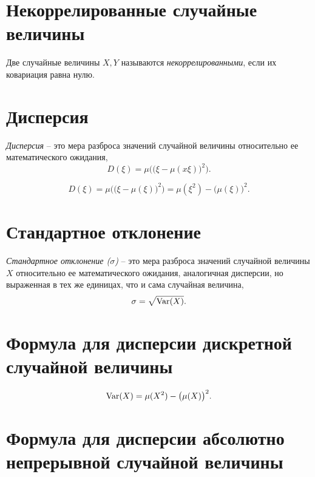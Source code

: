 \section{Некоррелированные случайные величины}

\begin{definition}
	Две случайные величины $X,Y$ называются \emph{некоррелированными}, если их ковариация равна нулю.
\end{definition}

\section{Дисперсия}

\begin{definition}[Дисперсия]
	\emph{Дисперсия} -- это мера разброса значений случайной величины относительно ее математического ожидания,
	\[
		D(\xi ) = \mu \Big(\big(\xi - \mu (x \xi )\big)^2\Big).
	\]
\end{definition}

\begin{remark}
	\[
		D(\xi ) = \mu \Big(\big(\xi - \mu (\xi )\big)^2\Big) = \mu (\xi^2) - \big(\mu (\xi )\big)^2.
	\]
\end{remark}

\section{Стандартное отклонение}

\begin{definition}
	\emph{Стандартное отклонение ($\sigma $)} -- это мера разброса значений случайной величины $X$ относительно ее математического ожидания, аналогичная дисперсии, но выраженная в тех же единицах, что и сама случайная величина,
	\[
		\sigma = \sqrt{\operatorname{Var}(X)} .
	\]
\end{definition}

\section{Формула для дисперсии дискретной случайной величины}

\[
	\operatorname{Var}(X) = \mu (X^2) - \big(\mu (X)\big)^2.
\]

\newpage

\section{Формула для дисперсии абсолютно непрерывной случайной величины}

